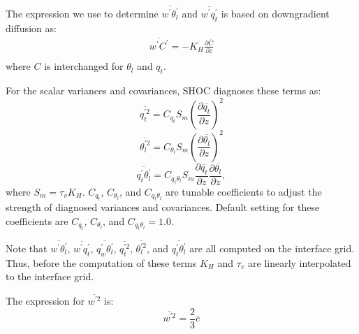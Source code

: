 \documentclass[12pt,titlepage]{article}
\numberwithin{equation}{section}
\begin{document}
The expression we use to determine $\overline{w^{'}\theta_{l}^{'}}$ and $\overline{w^{'}q_{t}^{'}}$ is based on downgradient diffusion as:
%
\begin{equation}
 \begin{split}
    \overline{w^{'}C^{'}}=-K_{H}\frac{\partial{\overline{C}}}{\partial{z}} \\
  \end{split}
  \label{downgradient4}
\end{equation}
%   
where $C$ is interchanged for $\theta_{l}$ and $q_{t}$.  

For the scalar variances and covariances, SHOC diagnoses these terms as:
%
\begin{equation}
  \overline{q_{t}^{'2}}=C_{q_{t}}S_{m}\left(\frac{\partial{\overline{q_{t}}}}{\partial{z}}\right)^{2}
  \label{bogen_qw2}
\end{equation}
%  
\begin{equation}
  \overline{\theta_{l}^{'2}}=C_{\theta_{l}}S_{m}\left(\frac{\partial{\overline{\theta_{l}}}}{\partial{z}}\right)^{2}
  \label{bogen_thl2}
\end{equation}
%  
\begin{equation}
  \overline{q_{t}^{'}\theta_{l}^{'}}=C_{q_{t}\theta_{l}}S_{m}\frac{\partial{\overline{q_{t}}}}{\partial{z}}\frac{\partial{\overline{\theta_{l}}}}{\partial{z}} , 
  \label{bogen_qwhl2}
\end{equation}
%  
where $S_{m}=\tau_{v} K_{H}$.  $C_{q_{t}}$, $C_{\theta_{l}}$, and $C_{q_{t}\theta_{l}}$ are tunable coefficients to adjust the strength of diagnosed variances and covariances.  Default setting for these coefficients are $C_{q_{t}}$, $C_{\theta_{l}}$, and $C_{q_{t}\theta_{l}}= 1.0$.

Note that $\overline{w^{'}\theta_{l}^{'}}$, $\overline{w^{'}q_{t}^{'}}$, $\overline{q_{w}^{'}\theta_{l}^{'}}$, $\overline{q_{t}^{'2}}$, $\overline{\theta_{l}^{'2}}$, and $\overline{q_{t}^{'}\theta_{l}^{'}}$ are all computed on the interface grid.  Thus, before the computation of these terms $K_{H}$ and $\tau_{v}$ are linearly interpolated to the interface grid.   

The expression for $\overline{w^{'2}}$ is:
%
\begin{equation}
  \overline{w^{'2}}=\frac{2}{3}\overline{e}
  \label{w2_param_2}
\end{equation}
%

\end{document}
